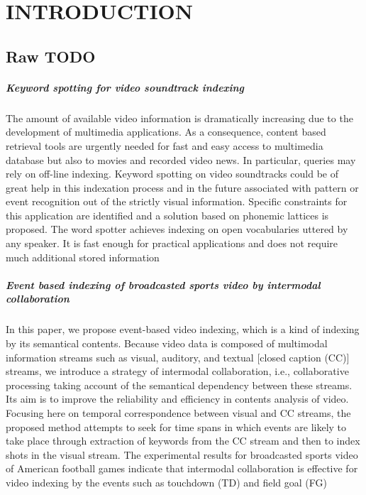 \chapter{INTRODUCTION}
\label{chap:intro}

\section{Raw TODO}

\paragraph{Keyword spotting for video soundtrack indexing}
The amount of available video information is dramatically increasing due to the development of multimedia applications. As a consequence, content based retrieval tools are urgently needed for fast and easy access to multimedia database but also to movies and recorded video news. In particular, queries may rely on off-line indexing. Keyword spotting on video soundtracks could be of great help in this indexation process and in the future associated with pattern or event recognition out of the strictly visual information. Specific constraints for this application are identified and a solution based on phonemic lattices is proposed. The word spotter achieves indexing on open vocabularies uttered by any speaker. It is fast enough for practical applications and does not require much additional stored information

\paragraph{Event based indexing of broadcasted sports video by intermodal collaboration}
In this paper, we propose event-based video indexing, which is a kind of indexing by its semantical contents. Because video data is composed of multimodal information streams such as visual, auditory, and textual [closed caption (CC)] streams, we introduce a strategy of intermodal collaboration, i.e., collaborative processing taking account of the semantical dependency between these streams. Its aim is to improve the reliability and efficiency in contents analysis of video. Focusing here on temporal correspondence between visual and CC streams, the proposed method attempts to seek for time spans in which events are likely to take place through extraction of keywords from the CC stream and then to index shots in the visual stream. The experimental results for broadcasted sports video of American football games indicate that intermodal collaboration is effective for video indexing by the events such as touchdown (TD) and field goal (FG)

